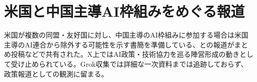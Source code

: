 \section{米国と中国主導AI枠組みをめぐる報道}
米国が複数の同盟・友好国に対し、中国主導のAI枠組みに参加する場合は米国主導のAI連合から除外する可能性を示す書簡を準備している、との報道がまとめ投稿などで共有された。X上ではAI政策・技術協力を巡る陣営形成の動きとして受け止められている。Grok収集では詳細な一次資料までは追跡しておらず、政策報道としての観測に留まる。
